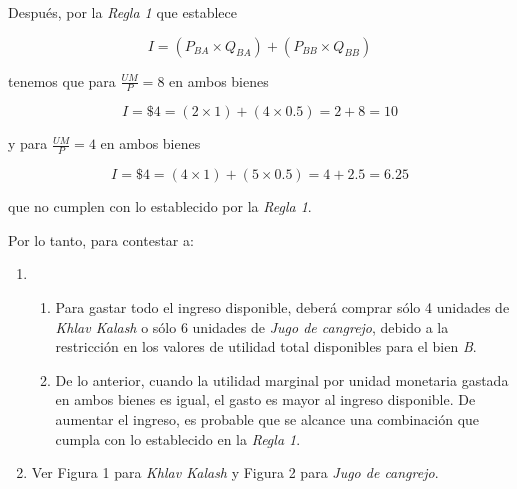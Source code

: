 \documentclass[a4paper,12pt]{article}
\begin{document}
Después, por la \emph{Regla 1} que establece

\[
	I = (P_{BA} \times Q_{BA})+(P_{BB} \times Q_{BB})
\]

tenemos que para $\frac{UM}{P} = 8$ en ambos bienes

\[
	I = \$4 = (2 \times 1)+(4 \times 0.5) = 2 + 8 = 10
\]

y para $\frac{UM}{P} = 4$ en ambos bienes

\[
	I = \$4 = (4 \times 1)+(5 \times 0.5) = 4 + 2.5 = 6.25
\]

que no cumplen con lo establecido por la \emph{Regla 1}.

\vspace{1cm}


Por lo tanto, para contestar a:\\


\begin{enumerate}[label=\alph*)]

\item 
	\begin{enumerate}[label=\arabic*.]
	\item Para gastar todo el ingreso disponible, deberá comprar sólo 4 unidades de \emph{Khlav Kalash} o sólo 6 unidades de \emph{Jugo de cangrejo}, debido a la restricción en los valores de utilidad total disponibles para el bien \emph{B}.
	\item De lo anterior, cuando la utilidad marginal por unidad monetaria gastada en ambos bienes es igual, el gasto es mayor al ingreso disponible. De aumentar el ingreso, es probable que se alcance una combinación que cumpla con lo establecido en la \emph{Regla 1}.
	\end{enumerate}

\item Ver Figura 1 para \emph{Khlav Kalash} y Figura 2 para \emph{Jugo de cangrejo}.\par

\end{enumerate}

\vspace{1cm}


\newpage
\end{document}
